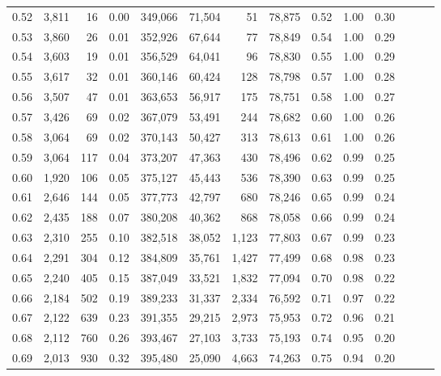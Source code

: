 \begin{tabular}{rrrrrrrrrrrrrr}
0.52 &   3,811 &     16 &  0.00 &  349,066 &   71,504 &      51 &  78,875 &  0.52 &  1.00 &      0.30 \\
0.53 &   3,860 &     26 &  0.01 &  352,926 &   67,644 &      77 &  78,849 &  0.54 &  1.00 &      0.29 \\
0.54 &   3,603 &     19 &  0.01 &  356,529 &   64,041 &      96 &  78,830 &  0.55 &  1.00 &      0.29 \\
0.55 &   3,617 &     32 &  0.01 &  360,146 &   60,424 &     128 &  78,798 &  0.57 &  1.00 &      0.28 \\
0.56 &   3,507 &     47 &  0.01 &  363,653 &   56,917 &     175 &  78,751 &  0.58 &  1.00 &      0.27 \\
0.57 &   3,426 &     69 &  0.02 &  367,079 &   53,491 &     244 &  78,682 &  0.60 &  1.00 &      0.26 \\
0.58 &   3,064 &     69 &  0.02 &  370,143 &   50,427 &     313 &  78,613 &  0.61 &  1.00 &      0.26 \\
0.59 &   3,064 &    117 &  0.04 &  373,207 &   47,363 &     430 &  78,496 &  0.62 &  0.99 &      0.25 \\
0.60 &   1,920 &    106 &  0.05 &  375,127 &   45,443 &     536 &  78,390 &  0.63 &  0.99 &      0.25 \\
0.61 &   2,646 &    144 &  0.05 &  377,773 &   42,797 &     680 &  78,246 &  0.65 &  0.99 &      0.24 \\
0.62 &   2,435 &    188 &  0.07 &  380,208 &   40,362 &     868 &  78,058 &  0.66 &  0.99 &      0.24 \\
0.63 &   2,310 &    255 &  0.10 &  382,518 &   38,052 &   1,123 &  77,803 &  0.67 &  0.99 &      0.23 \\
0.64 &   2,291 &    304 &  0.12 &  384,809 &   35,761 &   1,427 &  77,499 &  0.68 &  0.98 &      0.23 \\
0.65 &   2,240 &    405 &  0.15 &  387,049 &   33,521 &   1,832 &  77,094 &  0.70 &  0.98 &      0.22 \\
0.66 &   2,184 &    502 &  0.19 &  389,233 &   31,337 &   2,334 &  76,592 &  0.71 &  0.97 &      0.22 \\
0.67 &   2,122 &    639 &  0.23 &  391,355 &   29,215 &   2,973 &  75,953 &  0.72 &  0.96 &      0.21 \\
0.68 &   2,112 &    760 &  0.26 &  393,467 &   27,103 &   3,733 &  75,193 &  0.74 &  0.95 &      0.20 \\
0.69 &   2,013 &    930 &  0.32 &  395,480 &   25,090 &   4,663 &  74,263 &  0.75 &  0.94 &      0.20 \\

\end{tabular}
